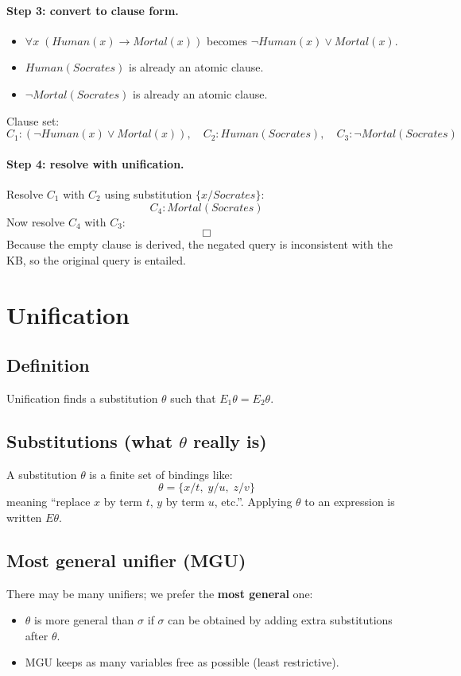 \documentclass[11pt]{article}
\begin{document}
\paragraph{Step 3: convert to clause form.}
\begin{itemize}[leftmargin=*]
  \item $\forall x\; (Human(x) \rightarrow Mortal(x))$ becomes $\lnot Human(x) \lor Mortal(x)$.
  \item $Human(Socrates)$ is already an atomic clause.
  \item $\lnot Mortal(Socrates)$ is already an atomic clause.
\end{itemize}
Clause set:
\[
  C_1:(\lnot Human(x) \lor Mortal(x)),\quad
  C_2:Human(Socrates),\quad
  C_3:\lnot Mortal(Socrates)
\]

\paragraph{Step 4: resolve with unification.}
Resolve $C_1$ with $C_2$ using substitution $\{x/Socrates\}$:
\[
  C_4:Mortal(Socrates)
\]
Now resolve $C_4$ with $C_3$:
\[
  \Box
\]
Because the empty clause is derived, the negated query is inconsistent with the KB, so the original query is entailed.

\section{Unification}
\subsection{Definition}
Unification finds a substitution $\theta$ such that $E_1\theta = E_2\theta$.

\subsection{Substitutions (what $\theta$ really is)}
A substitution $\theta$ is a finite set of bindings like:
\[
  \theta = \{x/t,\; y/u,\; z/v\}
\]
meaning ``replace $x$ by term $t$, $y$ by term $u$, etc.''.
Applying $\theta$ to an expression is written $E\theta$.

\subsection{Most general unifier (MGU)}
There may be many unifiers; we prefer the \textbf{most general} one:
\begin{itemize}[leftmargin=*]
  \item $\theta$ is more general than $\sigma$ if $\sigma$ can be obtained by adding extra substitutions after $\theta$.
  \item MGU keeps as many variables free as possible (least restrictive).
\end{itemize}
\end{document}
